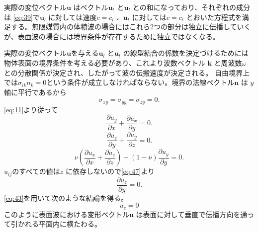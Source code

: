\documentclass[dvipdfmx]{jsreport}
\numberwithin{equation}{chapter}
\numberwithin{table}{chapter}
\begin{document}
実際の変位ベクトル$\bm{u}$ はベクトル$\bm{u}_t$ と$\bm{u}_l$ との和になっており、それぞれの成分は
\eqref{eq:39}で$\bm{u}_l$ に対しては速度$c=c_l$ 、$\bm{u}_t$ に対しては$c=c_t$ とおいた方程式を満足する。無限媒質内の体積波の場合にはこれら2つの部分は独立に伝播していくが、表面波の場合には境界条件が存在するために独立ではなくなる。

実際の変位ベクトル$\bm{u}$を与える$\bm{u}_l$ と$\bm{u}_t$ の線型結合の係数を決定づけるためには物体表面の境界条件を考える必要があり、これより波数ベクトル
$\bm{k}$ と周波数$\omega$ との分散関係が決定され、したがって波の伝搬速度が決定される。
自由境界上では$\sigma_{ik}n_k=0$という条件が成立しなければならない。境界の法線ベクトル$\bm{n}$ は
$y$ 軸に平行であるから
\begin{equation}
\label{eq:45}
	\sigma_{xy}=\sigma_{yy}=\sigma_{zy}=0
.\end{equation}
\eqref{eq:11}より従って
\begin{equation}
\label{eq:46}
	\frac{\partial u_y}{\partial x} +\frac{\partial u_x}{\partial y} =0
.\end{equation}
\begin{equation}
\label{eq:47}
	\frac{\partial u_z}{\partial y} +\frac{\partial u_y}{\partial z} =0
.\end{equation}
\begin{equation}
\label{eq:48}
	\nu (\frac{\partial u_x}{\partial x} +\frac{\partial u_z}{\partial z} )+(1-\nu)\frac{\partial u_y}{\partial y}=0 
.\end{equation}
$u_{ij}$のすべての値は$z$ に依存しないので\eqref{eq:47}より
\begin{equation}
\label{eq:49}
	\frac{\partial u_z}{\partial y} =0
.\end{equation}
\eqref{eq:43}を用いて次のような結論を得る。
\begin{equation}
\label{eq:50}
	u_{z}=0
\end{equation}
このように表面波における変形ベクトル$\bm{u}$ は表面に対して垂直で伝播方向を通って引かれる平面内に横たわる。
\end{document}
